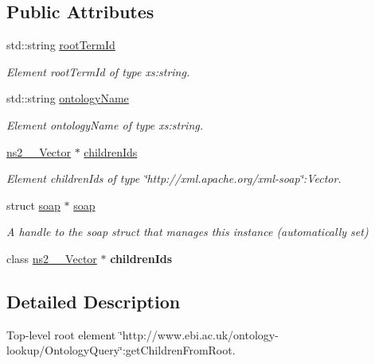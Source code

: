 \subsection*{Public Attributes}
\begin{DoxyCompactItemize}
\item 
std::string \hyperlink{class__ns1____getChildrenFromRoot_ac15da846ccc985bd285215b3e0ed94ad}{rootTermId}
\begin{DoxyCompactList}\small\item\em Element rootTermId of type xs:string. \end{DoxyCompactList}\item 
std::string \hyperlink{class__ns1____getChildrenFromRoot_a3e45501240a52ee09c5d35397f6ddafb}{ontologyName}
\begin{DoxyCompactList}\small\item\em Element ontologyName of type xs:string. \end{DoxyCompactList}\item 
\hyperlink{classns2____Vector}{ns2\_\-\_\-Vector} $\ast$ \hyperlink{class__ns1____getChildrenFromRoot_a6a4fc8be425fa39fc50be3c0a391e17c}{childrenIds}
\begin{DoxyCompactList}\small\item\em Element childrenIds of type \char`\"{}http://xml.apache.org/xml-\/soap\char`\"{}:Vector. \end{DoxyCompactList}\item 
\hypertarget{class__ns1____getChildrenFromRoot_a3f09001b540aac56dd1f759e8ed77b36}{
struct \hyperlink{class__ns1____getChildrenFromRoot_a3f09001b540aac56dd1f759e8ed77b36}{soap} $\ast$ \hyperlink{class__ns1____getChildrenFromRoot_a3f09001b540aac56dd1f759e8ed77b36}{soap}}
\label{class__ns1____getChildrenFromRoot_a3f09001b540aac56dd1f759e8ed77b36}

\begin{DoxyCompactList}\small\item\em A handle to the soap struct that manages this instance (automatically set) \end{DoxyCompactList}\item 
\hypertarget{class__ns1____getChildrenFromRoot_a86f7c29e0475a4328e471159b1d35606}{
class \hyperlink{classns2____Vector}{ns2\_\-\_\-Vector} $\ast$ {\bfseries childrenIds}}
\label{class__ns1____getChildrenFromRoot_a86f7c29e0475a4328e471159b1d35606}

\end{DoxyCompactItemize}


\subsection{Detailed Description}
Top-\/level root element \char`\"{}http://www.ebi.ac.uk/ontology-\/lookup/OntologyQuery\char`\"{}:getChildrenFromRoot. 

